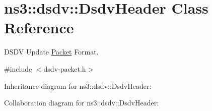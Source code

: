 \hypertarget{classns3_1_1dsdv_1_1DsdvHeader}{}\section{ns3\+:\+:dsdv\+:\+:Dsdv\+Header Class Reference}
\label{classns3_1_1dsdv_1_1DsdvHeader}


D\+S\+DV Update \hyperlink{classns3_1_1Packet}{Packet} Format.  




{\ttfamily \#include $<$dsdv-\/packet.\+h$>$}



Inheritance diagram for ns3\+:\+:dsdv\+:\+:Dsdv\+Header\+:


Collaboration diagram for ns3\+:\+:dsdv\+:\+:Dsdv\+Header\+:
